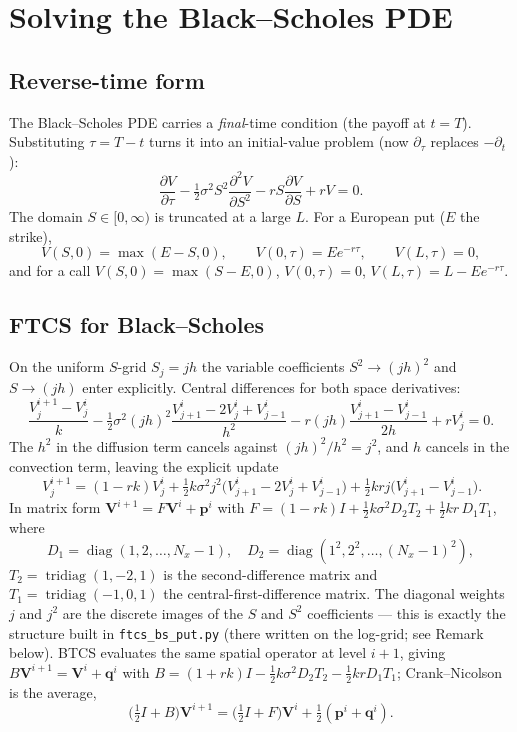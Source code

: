 \documentclass[11pt]{article}
\begin{document}
\section{Solving the Black--Scholes PDE}

\subsection{Reverse-time form}
The Black--Scholes PDE carries a \emph{final}-time condition (the payoff at $t=T$). Substituting $\tau=T-t$ turns it into an initial-value problem (now $\partial_\tau$ replaces $-\partial_t$):
\begin{equation}
\frac{\partial V}{\partial\tau} - \tfrac12\sigma^2 S^2\frac{\partial^2 V}{\partial S^2} - rS\frac{\partial V}{\partial S} + rV = 0 .
\label{eq:bspde}
\end{equation}
The domain $S\in[0,\infty)$ is truncated at a large $L$. For a European put ($E$ the strike),
\[
V(S,0)=\max(E-S,0),\qquad V(0,\tau)=Ee^{-r\tau},\qquad V(L,\tau)=0,
\]
and for a call $V(S,0)=\max(S-E,0)$, $V(0,\tau)=0$, $V(L,\tau)=L-Ee^{-r\tau}$.

\subsection{FTCS for Black--Scholes}
On the uniform $S$-grid $S_j=jh$ the variable coefficients $S^2\to(jh)^2$ and $S\to(jh)$ enter explicitly. Central differences for both space derivatives:
\[
\frac{V^{i+1}_j-V^i_j}{k}
-\tfrac12\sigma^2 (jh)^2\frac{V^i_{j+1}-2V^i_j+V^i_{j-1}}{h^2}
- r(jh)\frac{V^i_{j+1}-V^i_{j-1}}{2h}
+ rV^i_j = 0 .
\]
The $h^2$ in the diffusion term cancels against $(jh)^2/h^2 = j^2$, and $h$ cancels in the convection term, leaving the explicit update
\begin{equation}
\boxed{\,V^{i+1}_j = (1-rk)V^i_j + \tfrac12 k\sigma^2 j^2\big(V^i_{j+1}-2V^i_j+V^i_{j-1}\big) + \tfrac12 krj\big(V^i_{j+1}-V^i_{j-1}\big).}
\label{eq:bsftcs}
\end{equation}
In matrix form $\mathbf V^{i+1}=F\mathbf V^i+\mathbf p^i$ with $F=(1-rk)I + \tfrac12 k\sigma^2 D_2 T_2 + \tfrac12 kr\, D_1 T_1$, where
\[
D_1=\operatorname{diag}(1,2,\dots,N_x-1),\quad D_2=\operatorname{diag}(1^2,2^2,\dots,(N_x-1)^2),
\]
$T_2=\operatorname{tridiag}(1,-2,1)$ is the second-difference matrix and $T_1=\operatorname{tridiag}(-1,0,1)$ the central-first-difference matrix. The diagonal weights $j$ and $j^2$ are the discrete images of the $S$ and $S^2$ coefficients --- this is exactly the structure built in \texttt{ftcs\_bs\_put.py} (there written on the log-grid; see Remark below). BTCS evaluates the same spatial operator at level $i{+}1$, giving $B\mathbf V^{i+1}=\mathbf V^i+\mathbf q^i$ with $B=(1+rk)I-\tfrac12 k\sigma^2 D_2 T_2-\tfrac12 kr D_1 T_1$; Crank--Nicolson is the average,
\[
\big(\tfrac12 I + B\big)\mathbf V^{i+1} = \big(\tfrac12 I + F\big)\mathbf V^i + \tfrac12(\mathbf p^i+\mathbf q^i).
\]
\end{document}
